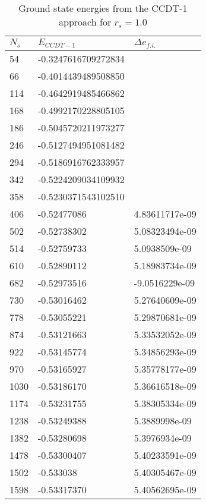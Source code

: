 \begin{table}[hbpt]
\caption{Ground state energies from the CCDT-1 approach for $r_s = 1.0$}
\begin{center}
\begin{threeparttable}
\begin{tabular}{l l l}
    \toprule
    $N_s$ & $E_{CCDT-1}$ & $\Delta e_{f.i.}$ \\ \hline
54  & -0.3247616709272834  \\
66   &-0.4014439489508850  \\
114  &-0.4642919485466862 \\
168  &-0.4992170228805105 \\
186  &-0.5045720211973277 \\
246  &-0.5127494951081482 \\
294  &-0.5186916762333957 \\
342 & -0.5224209034109932 \\
358 & -0.5230371543102510 \\ \hline
406  &-0.52477086       &   4.83611717e-09 \\
502  &-0.52738302       &   5.08323494e-09\\
514 & -0.52759733         &  5.0938509e-09\\
610 & -0.52890112        &  5.18983734e-09 \\    
682 & -0.52973516        &  -9.0516229e-09  \\   
730 & -0.53016462          & 5.27640609e-09\\     
778 & -0.53055221        &  5.29870681e-09 \\    
874 & -0.53121663        &  5.33532052e-09 \\    
922 & -0.53145774        &  5.34856293e-09 \\   
970 & -0.53165927        &  5.35778177e-09 \\    
1030 &-0.53186170       &   5.36616518e-09\\     
1174 &-0.53231755        &  5.38305334e-09\\     
1238 &-0.53249388        &  5.3889998e-09  \\    
1382 &-0.53280698        &  5.3976934e-09  \\   
1478 &-0.53300407        &  5.40233591e-09\\     
1502&  -0.533038         &    5.40305467e-09  \\
1598 &-0.53317370        &  5.40562695e-09\\   
\bottomrule
\end{tabular}

\end{threeparttable}
\end{center}
\end{table}
